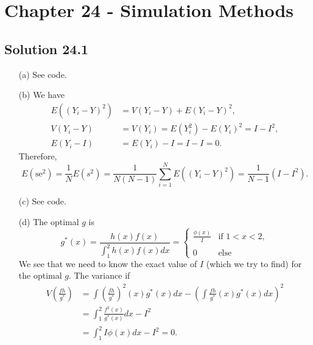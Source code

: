\section*{Chapter 24 - Simulation Methods}

\subsection*{Solution 24.1}

\begin{itemize}
    \item[(a)] See code.
    \item[(b)] We have
        \begin{equation*}
            \begin{split}
                E((Y_i - Y)^2) &= V(Y_i - Y) + E(Y_i - Y)^2, \\
                V(Y_i - Y) &= V(Y_i) = E(Y_i^2) - E(Y_i)^2 = I - I^2, \\
                E(Y_i - I) &= E(Y_i) - I = I - I = 0.
            \end{split}
        \end{equation*}
        Therefore,
        \begin{equation*}
            E(\mathrm{se}^2) = \frac{1}{N} E(s^2)
                = \frac{1}{N (N - 1)} \sum_{i = 1}^N E((Y_i - Y)^2)
                = \frac{1}{N - 1} (I - I^2).
        \end{equation*}
    \item[(c)] See code.
    \item[(d)] The optimal $g$ is
        \begin{equation*}
            g^*(x) = \frac{h(x) f(x)}{\int_1^2 h(x) f(x) dx}
                = \left\{ \begin{matrix}
                    \frac{\phi(x)}{I} & \text{if } 1 < x < 2, \\ \\
                    0 & \text{else}
                \end{matrix} \right.
        \end{equation*}
        We see that we need to know the exact value of $I$ (which we try to find) for the optimal $g$.
        The variance if
        \begin{equation*}
            \begin{split}
                V\left(\frac{f h}{g^*}\right)
                    &= \int \left(\frac{fh}{g^*}\right)^2(x) g^*(x) dx - \left( \int \frac{fh}{g^*}(x) g^*(x) dx \right)^2 \\
                    &= \int_1^2 \frac{f^2(x)}{g^*(x)} dx - I^2 \\
                    &= \int_1^2 I \phi(x) dx - I^2
                    = 0.
            \end{split}
        \end{equation*}
\end{itemize}
